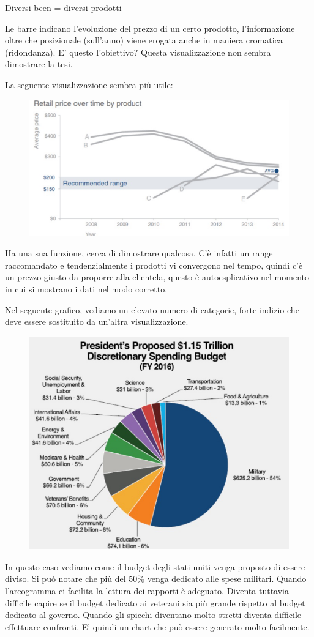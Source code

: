 \documentclass[12pt,a4paper]{report}
\begin{document}
Diversi been = diversi prodotti 

Le barre indicano l'evoluzione del prezzo di un certo prodotto, l'informazione oltre che posizionale (sull'anno) viene erogata anche in maniera cromatica (ridondanza). E' questo l'obiettivo? Questa visualizzazione non sembra dimostrare la tesi.

La seguente visualizzazione sembra più utile:


\begin{figure}[h]
	\centering
	\includegraphics[width=.6\textwidth]{imgs datavis/prezzi prodotti 1.png}\hfil
	
	\caption{}\label{}
\end{figure}

Ha una sua funzione, cerca di dimostrare qualcosa. C'è infatti un range raccomandato e tendenzialmente i prodotti vi convergono nel tempo, quindi c'è un prezzo giusto da proporre alla clientela, questo è autoesplicativo nel momento in cui si mostrano i dati nel modo corretto.

Nel seguente grafico, vediamo un elevato numero di categorie, forte indizio che deve essere sostituito da un'altra visualizzazione. 

\begin{figure} [h]
	\centering
	\includegraphics[width=.48\textwidth]{imgs datavis/spese.png}\hfil
	
	\caption{}\label{}
\end{figure}

In questo caso vediamo come il budget degli stati uniti venga proposto di essere diviso. Si può notare che più del 50\% venga dedicato alle spese militari. Quando l'areogramma ci facilita la lettura dei rapporti è adeguato. Diventa tuttavia difficile capire se il budget dedicato ai veterani sia più grande rispetto al budget dedicato al governo. Quando gli spicchi diventano molto stretti diventa difficile effettuare confronti. E' quindi un chart che può essere generato molto facilmente. 
\end{document}
